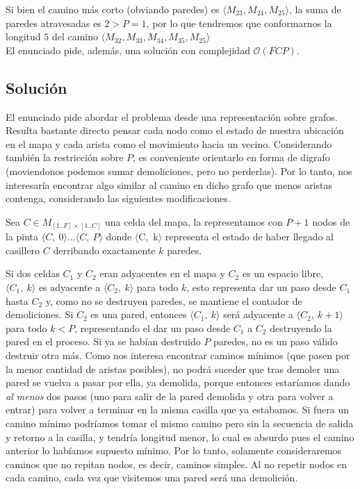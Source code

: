 Si bien el camino más corto (obviando paredes) es $\langle {M_{23}, M_{24}, M_{25}} \rangle$, la suma de paredes atravesadas es $2 > P = 1$, por lo que tendremos que conformarnos la longitud $5$ del camino  $\langle {M_{32}, M_{33}, M_{34}, M_{35}, M_{25}} \rangle$
\\

El enunciado pide, además, una solución con complejidad $\mathcal{O}(FCP)$.

\subsection{Solución}

El enunciado pide abordar el problema desde una representación sobre grafos. Resulta bastante directo pensar cada nodo como el estado de nuestra ubicación en el mapa y cada arista como el movimiento hacia un vecino. Considerando también la restricción sobre $P$, es conveniente orientarlo en forma de digrafo (moviendonos podemos sumar demoliciones, pero no perderlas). Por lo tanto, nos interesaría encontrar algo similar al camino en dicho grafo que menos aristas contenga, considerando las siguientes modificaciones.

Sea $C \in M_{[1..F]\times[1..C]}$ una celda del mapa, la representamos con $P+1$ nodos de la pinta $ \langle {C,\ 0} \rangle ... \langle {C,\ P} \rangle$ donde $\langle $C,\ k$ \rangle$ representa el estado de haber llegado al casillero $C$ derribando exactamente $k$ paredes.

Si dos celdas $C_1$ y $C_2$ eran adyacentes en el mapa y $C_2$ es un espacio libre, $\langle {C_1,\ k} \rangle$ es adyacente a $\langle {C_2,\ k} \rangle$ para todo $k$, esto representa dar un paso desde $C_1$ hasta $C_2$ y, como no se destruyen paredes, se mantiene el contador de demoliciones. Si $C_2$ es una pared, entonces $\langle {C_1,\ k} \rangle$ será adyacente a $\langle {C_2,\ k+1} \rangle$ para todo $k < P$, representando el dar un paso desde $C_1$ a $C_2$ destruyendo la pared en el proceso. Si ya se habían destruido $P$ paredes, no es un paso válido destruir otra más.
Como nos interesa encontrar caminos mínimos (que pasen por la menor cantidad de aristas posibles), no podrá suceder que tras demoler una pared se vuelva a pasar por ella, ya demolida, porque entonces estaríamos dando \emph{al menos} dos pasos (uno para salir de la pared demolida y otra para volver a entrar) para volver a terminar en la misma casilla que ya estabamos. Si fuera un camino mínimo podríamos tomar el mismo camino pero sin la secuencia de salida y retorno a la casilla, y tendría longitud menor, lo cual es absurdo pues el camino anterior lo habíamos supuesto mínimo. Por lo tanto, solamente consideraremos caminos que no repitan nodos, es decir, caminos simples.
Al no repetir nodos en cada camino, cada vez que visitemos una pared será una demolición.

